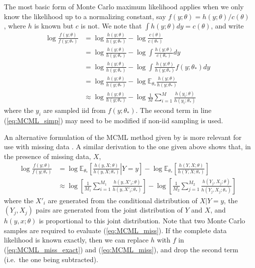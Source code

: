 \documentclass[11pt, oneside]{article}   	%
\newcommand{\bE}{\mathbb{E}}
\begin{document}
The most basic form of Monte Carlo maximum likelihood \citep{Gey91} applies when we only know the likelihood up to a normalizing constant, say $f(y; \theta) = h(y; \theta) / c(\theta)$, where $h$ is known but $c$ is not. We note that $\int h(y; \theta) dy = c(\theta)$, and write
%
\begin{align}
    \log \frac{f(y; \theta)}{f(y; \theta_*)} &= \log \frac{h(y; \theta)}{h(y; \theta_*)} - \log \frac{c(\theta)}{c(\theta_*)}\\
    &= \log \frac{h(y; \theta)}{h(y; \theta_*)} - \log \int \frac{h(y; \theta)}{c(\theta_*)} dy\\
    &= \log \frac{h(y; \theta)}{h(y; \theta_*)} - \log \int \frac{h(y; \theta)}{h(y; \theta_*)} f(y; \theta_*) dy\\
    &= \log \frac{h(y; \theta)}{h(y; \theta_*)} - \log \bE_{\theta_*} \frac{h(y; \theta)}{h(y; \theta_*)}\\
    & \approx \log \frac{h(y; \theta)}{h(y; \theta_*)} - \log \frac{1}{M} \sum_{i=1}^M \frac{h(y_i; \theta)}{h(y_i; \theta_*)} \label{eq:MCML_simp}
\end{align}
%
where the $y_i$ are sampled iid from $f(y; \theta_*)$. The second term in line (\ref{eq:MCML_simp}) may need to be modified if non-iid sampling is used.

An alternative formulation of the MCML method given by \citet{Gel93} is more relevant for use with missing data \citep[see also][]{Gey94}. A similar derivation to the one given above shows that, in the presence of missing data, $X$,
%
\begin{align}
    \log \frac{f(y; \theta)}{f(y; \theta_*)} &= \log \bE_{\theta_*} \left[ \left. \frac{h(y, X; \theta)}{h(y, X; \theta_*)} \right| Y=y \right] - \log \bE_{\theta_*} \left[\frac{h(Y, X; \theta)}{h(Y, X; \theta_*)}\right] \label{eq:MCML_miss_exact}\\
    & \approx \log \left[\frac{1}{M_1} \sum_{i=1}^{M_1} \frac{h(y, X'_i; \theta)}{h(y, X'_i; \theta_*)}\right] - \log \left[\frac{1}{M_2} \sum_{j = 1}^{M_2} \frac{h(Y_j, X_j; \theta)}{h(Y_j, X_j; \theta_*)}\right] \label{eq:MCML_miss}
\end{align}
%
where the $X'_i$ are generated from the conditional distribution of $X|Y=y$, the $(Y_j, X_j)$ pairs are generated from the joint distribution of $Y$ and $X$, and $h(y, x; \theta)$ is proportional to this joint distribution. Note that two Monte Carlo samples are required to evaluate (\ref{eq:MCML_miss}). If the complete data likelihood is known exactly, then we can replace $h$ with $f$ in (\ref{eq:MCML_miss_exact}) and (\ref{eq:MCML_miss}), and drop the second term (i.e.\ the one being subtracted).
\end{document}
